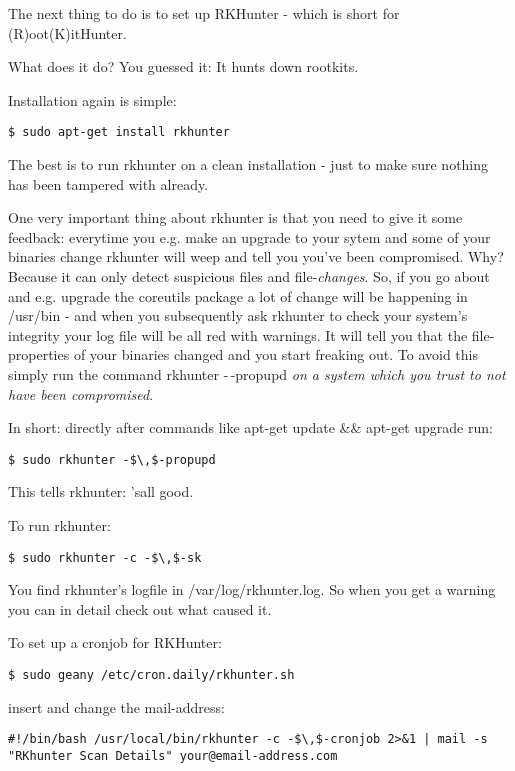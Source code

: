 \documentclass{article}
\begin{document}
 The next thing to do is to set up RKHunter - which is short for (R)oot(K)itHunter.


 What does it do? You guessed it: It hunts down rootkits. 


 Installation again is simple:
\begin{lstlisting}
$ sudo apt-get install rkhunter
\end{lstlisting}



 The best is to run rkhunter on a clean installation - just to make sure nothing has been tampered with already. 


 One very important thing about rkhunter is that you need to give it some feedback: everytime you e.g. make an upgrade to your sytem and some of your binaries change rkhunter will weep and tell you you've been compromised. Why? Because it can only detect suspicious files and file-\emph{changes}. So, if you go about and e.g. upgrade the coreutils package a lot of change will be happening in /usr/bin - and when you subsequently ask rkhunter to check your system's integrity your log file will be all red with warnings. It will tell you that the file-properties of your binaries changed and you start freaking out. To avoid this simply run the command rkhunter -$\,$-propupd \emph{on a system which you trust to not have been compromised}.


 In short: directly after commands like apt-get update \&\& apt-get upgrade run: 
\begin{lstlisting}
$ sudo rkhunter -$\,$-propupd 
\end{lstlisting}



 This tells rkhunter: 'sall good. 


 To run rkhunter: 
\begin{lstlisting}
$ sudo rkhunter -c -$\,$-sk
\end{lstlisting}



 You find rkhunter's logfile in /var/log/rkhunter.log. So when you get a warning you can in detail check out what caused it. 


 To set up a cronjob for RKHunter:
\begin{lstlisting}
$ sudo geany /etc/cron.daily/rkhunter.sh
\end{lstlisting}



 insert and change the mail-address:
\begin{lstlisting}
#!/bin/bash /usr/local/bin/rkhunter -c -$\,$-cronjob 2>&1 | mail -s "RKhunter Scan Details" your@email-address.com
\end{lstlisting}
\end{document}
